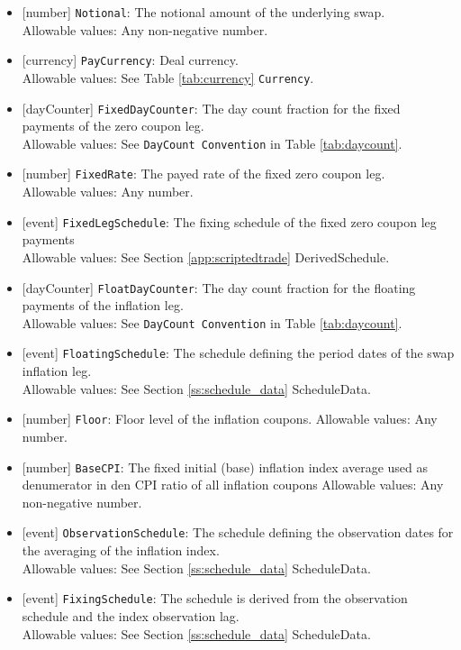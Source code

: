 \begin{itemize} 
  \item{}[number] \lstinline!Notional!: The notional amount of the underlying swap. \\
  Allowable values: Any non-negative number.
  \item{}[currency] \lstinline!PayCurrency!: Deal currency. \\
  Allowable values: See Table \ref{tab:currency} \lstinline!Currency!.
  \item{}[dayCounter] \lstinline!FixedDayCounter!: The day count fraction for the fixed payments of the zero coupon leg. \\
  Allowable values: See \lstinline!DayCount Convention! in Table \ref{tab:daycount}.
  \item{}[number] \lstinline!FixedRate!: The payed rate of the fixed zero coupon leg. \\
  Allowable values: Any number.
  \item{}[event] \lstinline!FixedLegSchedule!: The fixing schedule of the fixed zero coupon leg payments\\
  Allowable values: See Section \ref{app:scriptedtrade} DerivedSchedule.
  \item{}[dayCounter] \lstinline!FloatDayCounter!: The day count fraction for the floating payments of the inflation leg. \\
  Allowable values: See \lstinline!DayCount Convention! in Table \ref{tab:daycount}.
  \item{}[event] \lstinline!FloatingSchedule!: The schedule defining the period dates of the swap inflation leg. \\
  Allowable values: See Section \ref{ss:schedule_data} ScheduleData.
  \item{}[number] \lstinline!Floor!: Floor level of the inflation coupons.
  Allowable values: Any number.
  \item{}[number] \lstinline!BaseCPI!: The fixed initial (base) inflation index average used as denumerator in den CPI ratio of all inflation coupons
  Allowable values: Any non-negative number.
  \item{}[event] \lstinline!ObservationSchedule!: The schedule defining the observation dates for the averaging of the inflation index.\\
  Allowable values: See Section \ref{ss:schedule_data} ScheduleData.
  \item{}[event] \lstinline!FixingSchedule!: The schedule is derived from the observation schedule and the index observation lag.\\
  Allowable values: See Section \ref{ss:schedule_data} ScheduleData.
  
\end{itemize}

